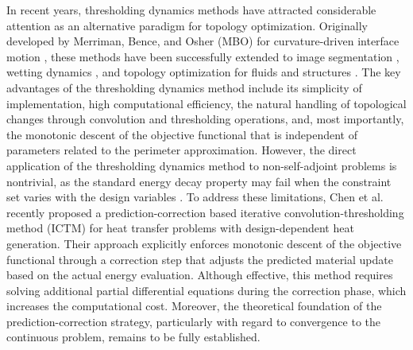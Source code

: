 \documentclass{amsart}
\begin{document}
In recent years, thresholding dynamics methods have attracted considerable attention as an alternative paradigm for topology optimization. Originally developed by Merriman, Bence, and Osher (MBO) for curvature-driven interface motion \cite{Ruuth2001}, these methods have been successfully extended to image segmentation \cite{Shen2002,ESEDOGLU2006367}, wetting dynamics \cite{XU2017510}, and topology optimization for fluids \cite{CHEN2022} and structures \cite{CHEN202311891216}. The key advantages of the thresholding dynamics method include its simplicity of implementation, high computational efficiency, the natural handling of topological changes through convolution and thresholding operations, and, most importantly, the monotonic descent of the objective functional that is independent of parameters related to the perimeter approximation. However, the direct application of the thresholding dynamics method to non-self-adjoint problems is nontrivial, as the standard energy decay property may fail when the constraint set varies with the design variables \cite{CHEN2024113119}. To address these limitations, Chen et al. \cite{CHEN2024113119} recently proposed a prediction-correction based iterative convolution-thresholding method (ICTM) for heat transfer problems with design-dependent heat generation. Their approach explicitly enforces monotonic descent of the objective functional through a correction step that adjusts the predicted material update based on the actual energy evaluation. Although effective, this method requires solving additional partial differential equations during the correction phase, which increases the computational cost. Moreover, the theoretical foundation of the prediction-correction strategy, particularly with regard to convergence to the continuous problem, remains to be fully established.
\end{document}
